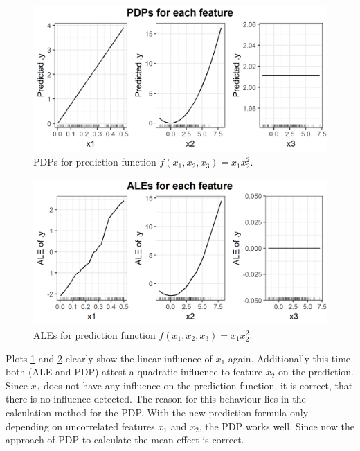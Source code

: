 \documentclass[
]{krantz}
\begin{document}
\begin{figure}
\includegraphics[width=1\linewidth]{images/ale_1_PDPs_x1x22_150_0_0p5_2_2} \caption{PDPs for prediction function \(f(x_1, x_2, x_3) = x_1 x_2^2\).}\label{fig:pdpsx1x22}
\end{figure}



\begin{figure}
\includegraphics[width=1\linewidth]{images/ale_1_ALEs_x1x22_150_0_0p5_2_2} \caption{ALEs for prediction function \(f(x_1, x_2, x_3) = x_1 x_2^2\).}\label{fig:alesx1x22}
\end{figure}



Plots \ref{fig:pdpsx1x22} and \ref{fig:alesx1x22} clearly show the linear influence of \(x_1\) again. Additionally this time both (ALE and PDP) attest a quadratic influence to feature \(x_2\) on the prediction. Since \(x_3\) does not have any influence on the prediction function, it is correct, that there is no influence detected.
The reason for this behaviour lies in the calculation method for the PDP. With the new prediction formula only depending on uncorrelated features \(x_1\) and \(x_2\), the PDP works well. Since now the approach of PDP to calculate the mean effect is correct.
\end{document}
